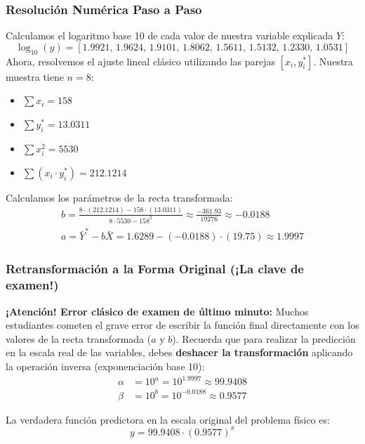 \documentclass[11pt,a4paper]{article}
\begin{document}
    \subsubsection*{Resolución Numérica Paso a Paso}
    Calculamos el logaritmo base 10 de cada valor de nuestra variable explicada $Y$:
    \[ \log_{10}(y) = [1.9921, \, 1.9624, \, 1.9101, \, 1.8062, \, 1.5611, \, 1.5132, \, 1.2330, \, 1.0531] \]
    Ahora, resolvemos el ajuste lineal clásico utilizando las parejas $[x_i, y^*_i]$. Nuestra muestra tiene $n = 8$:
    \begin{itemize}
        \item $\sum x_i = 158$
        \item $\sum y^*_i = 13.0311$
        \item $\sum x_i^2 = 5530$
        \item $\sum (x_i \cdot y^*_i) = 212.1214$
    \end{itemize}
    Calculamos los parámetros de la recta transformada:
    \begin{align*}
        b = \frac{8 \cdot (212.1214) - 158 \cdot (13.0311)}{8 \cdot 5530 - 158^2} \approx \frac{-361.93}{19276} \approx \mathbf{-0.0188} \\
        a = \bar{Y}^* - b \bar{X} = 1.6289 - (-0.0188) \cdot (19.75) \approx \mathbf{1.9997}
    \end{align*}

    \subsubsection*{Retransformación a la Forma Original (¡La clave de examen!)}
    \begin{importante}
        \textbf{¡Atención! Error clásico de examen de último minuto:} Muchos estudiantes cometen el grave error de escribir la función final directamente con los valores de la recta transformada ($a$ y $b$). Recuerda que para realizar la predicción en la escala real de las variables, debes \textbf{deshacer la transformación} aplicando la operación inversa (exponenciación base 10):
        \begin{align}
            \alpha &= 10^a = 10^{1.9997} \approx \mathbf{99.9408} \\
            \beta &= 10^b = 10^{-0.0188} \approx \mathbf{0.9577}
        \end{align}
    \end{importante}
    La verdadera función predictora en la escala original del problema físico es:
    \[ y = 99.9408 \cdot (0.9577)^x \]
\end{document}
